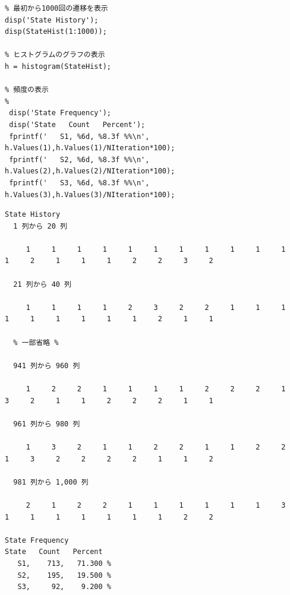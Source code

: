 \documentclass[documentclass]{jsarticle}
\begin{document}
\begin{lstlisting}[caption=1000回遷移させるためのプログラム]
%% Evaluation
% 最初から1000回の遷移を表示
disp('State History');
disp(StateHist(1:1000));

% ヒストグラムのグラフの表示
h = histogram(StateHist);

% 頻度の表示
%
 disp('State Frequency');
 disp('State   Count   Percent');
 fprintf('   S1, %6d, %8.3f %%\n', h.Values(1),h.Values(1)/NIteration*100);
 fprintf('   S2, %6d, %8.3f %%\n', h.Values(2),h.Values(2)/NIteration*100);
 fprintf('   S3, %6d, %8.3f %%\n', h.Values(3),h.Values(3)/NIteration*100);

\end{lstlisting}

\begin{lstlisting}[caption=ソースコード5を実行した際の結果]
  State History
  1 列から 20 列

     1     1     1     1     1     1     1     1     1     1     1     1     2     1     1     1     2     2     3     2

  21 列から 40 列

     1     1     1     1     2     3     2     2     1     1     1     1     1     1     1     1     1     2     1     1

  % 一部省略 %

  941 列から 960 列

     1     2     2     1     1     1     1     2     2     2     1     3     2     1     1     2     2     2     1     1

  961 列から 980 列

     1     3     2     1     1     2     2     1     1     2     2     1     3     2     2     2     2     1     1     2

  981 列から 1,000 列

     2     1     2     2     1     1     1     1     1     1     3     1     1     1     1     1     1     1     2     2

State Frequency
State   Count   Percent
   S1,    713,   71.300 %
   S2,    195,   19.500 %
   S3,     92,    9.200 %
\end{lstlisting}
\end{document}
